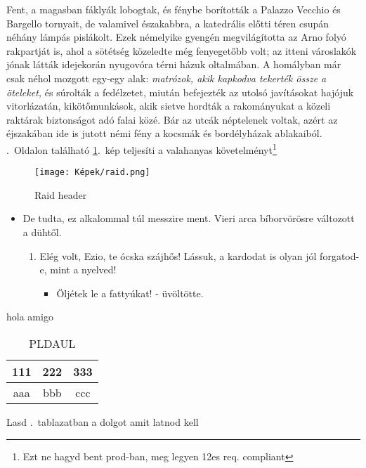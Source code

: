 \documentclass[12pt,a4paper]{report}
\begin{document}
Fent, a magasban fáklyák lobogtak, és fénybe borították a Palazzo Vecchio és Bargello tornyait, de valamivel északabbra, a katedrális előtti téren csupán néhány lámpás pislákolt. Ezek némelyike gyengén megvilágította az Arno folyó rakpartját is, ahol a sötétség közeledte még fenyegetőbb volt; az itteni városlakók jónak látták idejekorán nyugovóra  térni  házuk  oltalmában. A homályban  már  csak  néhol mozgott  egy-egy  alak:  \emph{matrózok,  akik  kapkodva  tekerték  össze  a öteleket,}  és  súrolták  a  fedélzetet,  miután  befejezték  az  utolsó javításokat hajójuk vitorlázatán, kikötőmunkások, akik sietve hordták a rakományukat a közeli raktárak biztonságot adó falai közé. Bár az utcák néptelenek voltak, azért az éjszakában ide is jutott némi fény a kocsmák és bordélyházak ablakaiból.
\Az{\pageref{abra-raid}}.~Oldalon található \ref{abra-raid}.~kép teljesíti a valahanyas követelményt\footnote{Ezt ne hagyd bent prod-ban, meg legyen 12es req. compliant}


\begin{figure}[th!]
    \centering
    \texttt{[image: Képek/raid.png]}
    \caption{Raid header}
    \label{abra-raid}
\end{figure}

\begin{itemize}
    \item De  tudta, ez alkalommal túl messzire  ment. Vieri arca bíborvörösre változott a dühtől. 
    \begin{enumerate}
        \item Elég volt, Ezio, te ócska szájhős! Lássuk, a kardodat is olyan jól 
        forgatod-e, mint a nyelved!
        \begin{itemize}
            \item Öljétek le a fattyúkat! - üvöltötte.
        \end{itemize}
    \end{enumerate}
\end{itemize}

\color{blue}hola amigo


\begin{table}[th!]
    \centering
    \begin{tabular}{c|c|c}
        \hline
        111&222&333\\
        \hline
        aaa&bbb&ccc\\
        \hline
    \end{tabular}
    \caption{PLDAUL}
    \label{tablazatom}
\end{table}

Lasd \az{\ref{abra-raid}}.~tablazatban a dolgot amit latnod kell
\end{document}

